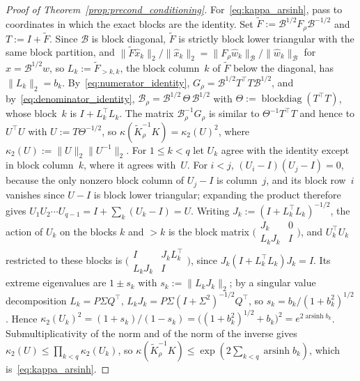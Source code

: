 \documentclass[hidelinks]{siamart}
\theoremstyle{nonumberplain}
\numberwithin{theorem}{section}
\begin{document}
\begin{proof}[Proof of Theorem~\textup{\ref{prop:precond_conditioning}}]
For~\eqref{eq:kappa_arsinh}, pass to coordinates in which the exact
blocks are the identity.  Set
$\widetilde{F} := \mathcal{B}^{1/2} F_\rho \mathcal{B}^{-1/2}$ and
$T := I + \widetilde{F}$.  Since $\mathcal{B}$ is block diagonal,
$\widetilde{F}$ is strictly block lower triangular with the same block
partition, and $\|\widetilde{F} \hat{x}_k\|_2 / \|\hat{x}_k\|_2
= \|F_\rho \hat{w}_k\|_{\mathcal{B}} / \|\hat{w}_k\|_{\mathcal{B}}$ for $x = \mathcal{B}^{1/2} w$, so
$L_k := \widetilde{F}_{>k,k}$, the block column~$k$ of $\widetilde{F}$
below the diagonal, has $\|L_k\|_2 = b_k$.
By~\eqref{eq:numerator_identity}, $G_\rho = \mathcal{B}^{1/2} T^\top T \mathcal{B}^{1/2}$,
and by~\eqref{eq:denominator_identity},
$\mathcal{B}_\rho = \mathcal{B}^{1/2}\, \Theta\, \mathcal{B}^{1/2}$ with
$\Theta := \operatorname{blockdiag}(T^\top T)$, whose block~$k$ is
$I + L_k^\top L_k$.  The matrix $\mathcal{B}_\rho^{-1} G_\rho$ is similar to
$\Theta^{-1} T^\top T$ and hence to $U^\top U$ with
$U := T \Theta^{-1/2}$, so
$\kappa(\widetilde{K}_\rho^{-1} K) = \kappa_2(U)^2$, where
$\kappa_2(U) := \|U\|_2 \|U^{-1}\|_2$.  For $1 \leq k < q$ let $U_k$
agree with the identity except in block column~$k$, where it agrees
with~$U$.  For $i < j$, $(U_i - I)(U_j - I) = 0$, because the only
nonzero block column of $U_j - I$ is column~$j$, and its block row~$i$
vanishes since $U - I$ is block lower triangular; expanding
the product therefore gives $U_1 U_2 \cdots U_{q-1} = I + \sum_k (U_k - I)
= U$.  Writing $J_k := (I + L_k^\top L_k)^{-1/2}$, the action of $U_k$
on the blocks $k$ and $> k$ is the block matrix
$\bigl(\begin{smallmatrix} J_k & 0 \\ L_k J_k & I \end{smallmatrix}\bigr)$,
and $U_k^\top U_k$ restricted to these blocks is
$\bigl(\begin{smallmatrix} I & J_k L_k^\top \\ L_k J_k & I \end{smallmatrix}\bigr)$,
since $J_k (I + L_k^\top L_k) J_k = I$.  Its extreme eigenvalues are
$1 \pm s_k$ with $s_k := \|L_k J_k\|_2$; by a singular value
decomposition $L_k = P \Sigma Q^\top$, $L_k J_k = P \Sigma (I + \Sigma^2)^{-1/2} Q^\top$,
so $s_k = b_k / (1 + b_k^2)^{1/2}$.  Hence
$\kappa_2(U_k)^2 = (1 + s_k)/(1 - s_k)
 = \bigl((1+b_k^2)^{1/2} + b_k\bigr)^2 = e^{2 \operatorname{arsinh} b_k}$.
Submultiplicativity of the norm and of the norm of the inverse gives
$\kappa_2(U) \leq \prod_{k<q} \kappa_2(U_k)$, so
$\kappa(\widetilde{K}_\rho^{-1} K)
 \leq \exp(2 \sum_{k<q} \operatorname{arsinh} b_k)$, which
is~\eqref{eq:kappa_arsinh}.
\end{proof}
\end{document}
